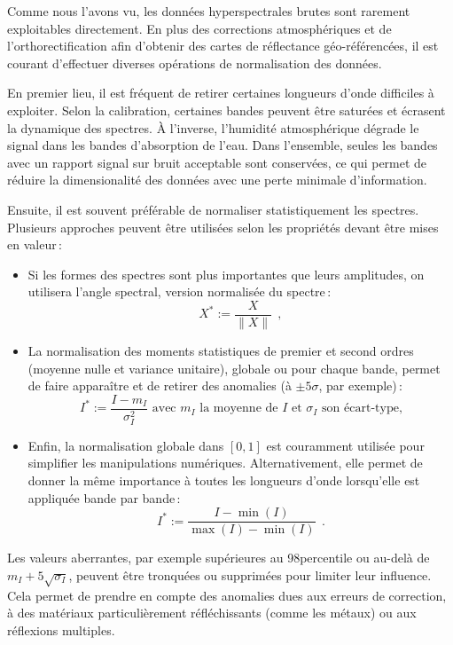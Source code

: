 Comme nous l'avons vu, les données hyperspectrales brutes sont rarement exploitables directement. En plus des corrections atmosphériques et de l'orthorectification afin d'obtenir des cartes de réflectance géo-référencées, il est courant d'effectuer diverses opérations de normalisation des données.

En premier lieu, il est fréquent de retirer certaines longueurs d'onde difficiles à exploiter. Selon la calibration, certaines bandes peuvent être saturées et écrasent la dynamique des spectres. À l'inverse, l'humidité atmosphérique dégrade le signal dans les bandes d'absorption de l'eau. Dans l'ensemble, seules les bandes avec un rapport signal sur bruit acceptable sont conservées, ce qui permet de réduire la dimensionalité des données avec une perte minimale d'information.

Ensuite, il est souvent préférable de normaliser statistiquement les spectres. Plusieurs approches peuvent être utilisées selon les propriétés devant être mises en valeur\,:
\begin{itemize}
\item Si les formes des spectres sont plus importantes que leurs amplitudes, on utilisera l'angle spectral, version normalisée du spectre\,:
$$X^* := \frac{X}{\| X \|}~~,$$
\item La normalisation des moments statistiques de premier et second ordres (moyenne nulle et variance unitaire), globale ou pour chaque bande, permet de faire apparaître et de retirer des anomalies (à $\pm5\sigma$, par exemple)\,:
$$I^* := \frac{I - m_I}{\sigma^2_I} \text{ avec } m_I \text{ la moyenne de } I \text{ et } \sigma_I \text{ son écart-type,}$$
\item Enfin, la normalisation globale dans $[0,1]$  est couramment utilisée pour simplifier les manipulations numériques. Alternativement, elle permet de donner la même importance à toutes les longueurs d'onde lorsqu'elle est appliquée bande par bande\,:
$$I^* := \frac{I - \min(I)}{\max(I) - \min(I)}~~.$$
\end{itemize}

Les valeurs aberrantes, par exemple supérieures au 98\ieme percentile ou au-delà de $m_I + 5\sqrt{\sigma_I}$, peuvent être tronquées ou supprimées pour limiter leur influence. Cela permet de prendre en compte des anomalies dues aux erreurs de correction, à des matériaux particulièrement réfléchissants (comme les métaux) ou aux réflexions multiples.

